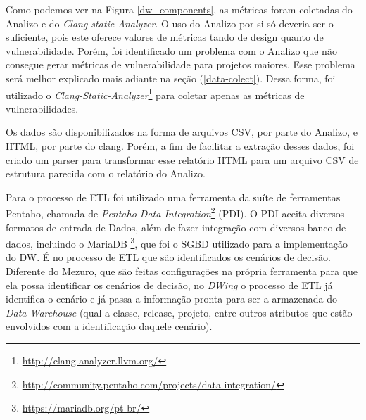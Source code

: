 Como podemos ver na Figura \ref{dw_components}, as métricas foram coletadas do Analizo e do \emph{Clang static Analyzer}. O uso do Analizo por si só deveria ser o suficiente, pois este oferece valores de métricas tando de design quanto de vulnerabilidade. Porém, foi identificado um problema com o Analizo que não consegue gerar métricas de vulnerabilidade para projetos maiores. Esse problema será melhor explicado mais adiante na seção (\ref{data-colect}). Dessa forma, foi utilizado o \emph{Clang-Static-Analyzer}\footnote{\url{http://clang-analyzer.llvm.org/}} para coletar apenas as métricas de vulnerabilidades.

%
Os dados são disponibilizados na forma de arquivos CSV, por parte do Analizo, e HTML, por parte do clang. Porém, a fim de facilitar a extração desses dados, foi criado um parser para transformar esse relatório HTML para um arquivo CSV de estrutura parecida com o relatório do Analizo.


Para o processo de ETL foi utilizado uma ferramenta da suíte de ferramentas Pentaho, chamada de \emph{Pentaho Data Integration}\footnote{\url{http://community.pentaho.com/projects/data-integration/}} (PDI). O PDI aceita diversos formatos de entrada de Dados, além de fazer integração com diversos banco de dados, incluindo o MariaDB \footnote{\url{https://mariadb.org/pt-br/}}, que foi o SGBD utilizado para a implementação do DW. É no processo de ETL que são identificados os cenários de decisão. Diferente do Mezuro, que são feitas configurações na própria ferramenta para que ela possa identificar os cenários de decisão, no \emph{DWing} o processo de ETL já identifica o cenário e já passa a informação pronta para ser a armazenada do \emph{Data Warehouse} (qual a classe, release, projeto, entre outros atributos que estão envolvidos com a identificação daquele cenário).

